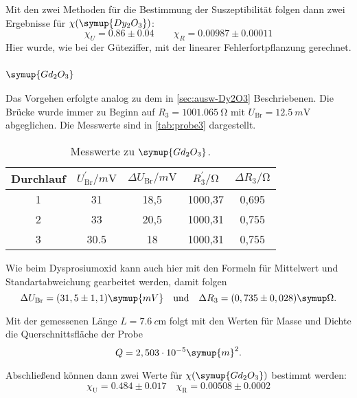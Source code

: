 Mit den zwei Methoden für die Bestimmung der Suszeptibilität folgen dann zwei Ergebnisse
für $\chi(\symup{Dy_2O_3})$:
\begin{equation}
	\chi_U = 0.86 \pm 0.04
	\qquad
	\chi_R = 0.00987 \pm 0.00011
\end{equation}
Hier wurde, wie bei der Güteziffer, mit der linearer Fehlerfortpflanzung gerechnet.

\subsubsection{$\symup{Gd_2O_3}$}

Das Vorgehen erfolgte analog zu dem in \autoref{sec:ausw-Dy2O3} Beschriebenen. Die Brücke
wurde immer zu Beginn auf $R_3 = \SI{1001.065}{\ohm}$ mit $U_\text{Br} =
\SI{12.5}{m\volt}$ abgeglichen. Die Messwerte sind in \autoref{tab:probe3} dargestellt.

\begin{table}
  \centering
  \caption{Messwerte zu $\symup{Gd_2O_3}$.}
  \label{tab:probe3}
  \begin{tabular}{c c c c c}
  \toprule
  Durchlauf &
  $U_\text{Br}^\prime / \si{m\volt}$ &
  $\Delta U_\text{Br} / \si{m\volt}$ &
  $R_3^\prime / \si{\ohm} $ &
  $\Delta R_3 / \si{\ohm} $ \\
  \midrule
  1 & 31 & 18,5 & 1000,37 & 0,695 \\
  2 & 33 & 20,5 & 1000,31 & 0,755 \\
  3 & 30.5 & 18 & 1000,31 & 0,755 \\
  \bottomrule
  \end{tabular}
\end{table}

Wie beim Dysprosiumoxid kann auch hier mit den Formeln für Mittelwert und
Standartabweichung gearbeitet werden, damit folgen 
\begin{equation}
	\Delta U_\text{Br} = (31,5 \pm 1,1) \symup{mV}
	\quad
	\text{und}
	\quad
	\Delta R_3 = (0,735 \pm 0,028) \symup\Omega.
\end{equation}

Mit der gemessenen Länge $L = \SI{7.6}{c\meter}$ folgt mit den Werten für Masse und Dichte
die Querschnittsfläche der Probe
\begin{equation}
	Q = 2,503 \cdot 10^{-5} \symup{m}^2.
\end{equation}

Abschließend können dann zwei Werte für $\chi(\symup{Gd_2O_3})$ bestimmt werden:
\begin{equation}
	\chi_\text{U} = 0.484 \pm 0.017
	\quad
	\chi_\text{R} = 0.00508 \pm 0.0002
\end{equation}


